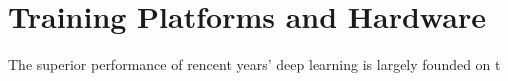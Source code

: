 \section{Training Platforms and Hardware}
The superior performance of rencent years' deep learning is largely founded on t